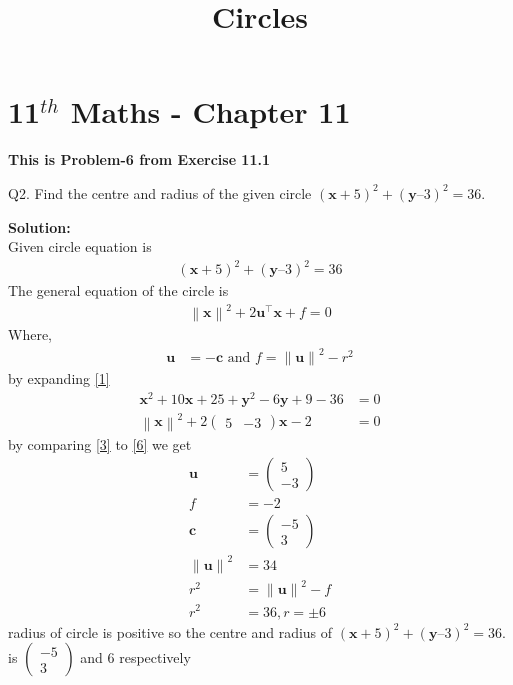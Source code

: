 \documentclass[12pt]{article}
\providecommand{\norm}[1]{\left\lVert#1\right\rVert}
\newcommand{\solution}{\noindent \textbf{Solution: }}
\newcommand{\myvec}[1]{\ensuremath{\begin{pmatrix}#1\end{pmatrix}}}
\let\vec\mathbf
\begin{document}
\begin{center}
\title{\textbf{Circles}}
\date{\vspace{-5ex}} %
\maketitle
\end{center}
\setcounter{page}{1}
\section{11$^{th}$ Maths - Chapter 11}
\textbf{This is Problem-6 from Exercise 11.1 }

Q2. Find the centre and radius of the given circle $(\vec{x} + 5)^2 + (\vec{y} – 3)^2 = 36.$

\solution
\\
Given circle equation is
\begin{align}
	(\vec{x} + 5)^2 + (\vec{y} – 3)^2 = 36 \label{1}
\end{align}
The general equation of  the circle is 
\begin{align}
	\norm{\vec{x}}^{2} + 2\vec{u}^{\top}\vec{x} + f = 0
\end{align}
Where,
\begin{align}
	\vec{u} &= -\vec{c} \text{ and } f = \norm{\vec{u}}^{2} - r^{2}\label{3}
\end{align}
by expanding \eqref{1}
\begin{align}
	\vec{x}^2+10\vec{x}+25+\vec{y}^2-6\vec{y}+9-36&=0\\
	\norm{\vec{x}}^2+2\myvec{5 & -3}\vec{x}-2&=0\label{6}
\end{align}	
by comparing \eqref{3} to \eqref{6} we get
\begin{align}
 \vec{u}&=\myvec{5\\ -3}\\
 f&=-2\\
\vec{c}&=\myvec{-5 \\ 3}\\
\norm{\vec{u}}^2&=34\\
r^2&=\norm{\vec{u}}^2-f\\
r^2&= 36,r=\pm6
\end{align}
radius of circle is positive so 
the centre and radius of $(\vec{x} + 5)^2 + (\vec{y} – 3)^2 = 36.$ is $\myvec{-5 \\ 3}$ and $6$ respectively
\end{document}
